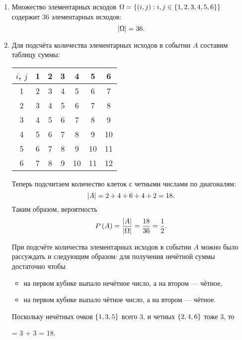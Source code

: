 \begin{enumerate}
    \item
    Множество элементарных исходов $\Omega = \left \{ (i, j): i, j \in \left \{ 1, 2, 3, 4, 5, 6\right \} \right \}$ содержит 36 элементарных исходов:
    \begin{equation}
        \left | \Omega \right | = 36.
    \end{equation}

    \item
    Для подсчёта количества элементарных исходов в событии $A$ составим таблицу суммы:
    \begin{center}
        \begin{tabular}{c|c|c|c|c|c|c|}
            $i$, $j$ & 1 & 2 & 3 & 4  & 5  & 6  \\
            \hline
            1        & 2 & 3 & 4 & 5  & 6  & 7  \\
            \hline
            2        & 3 & 4 & 5 & 6  & 7  & 8  \\
            \hline
            3        & 4 & 5 & 6 & 7  & 8  & 9  \\
            \hline
            4        & 5 & 6 & 7 & 8  & 9  & 10 \\
            \hline
            5        & 6 & 7 & 8 & 9  & 10 & 11 \\
            \hline
            6        & 7 & 8 & 9 & 10 & 11 & 12 \\
            \hline
        \end{tabular}
    \end{center}
    Теперь подсчитаем количество клеток с четными числами по диагоналям:
    \begin{equation}
        \left | A \right | = 2 + 4 + 6 + 4 + 2 = 18 .
    \end{equation}
    Таким образом, вероятность
    \begin{equation}
        P \left ( A \right ) = \frac{\left | A \right |}{\left | \Omega \right |} = \frac{18}{36} = \frac{1}{2} .
    \end{equation}

    При подсчёте количества элементарных исходов в событии $A$ можно было рассуждать и следующим образом: для получения нечётной суммы достаточно чтобы
    \begin{itemize}
        \item на первом кубике выпало нечётное число, а на втором --- чётное,
        \item на первом кубике выпало чётное число, а на втором --- чётное.
    \end{itemize}
    Поскольку нечётных очков $\left \{ 1, 3, 5 \right \}$ всего 3, и четных $\left \{ 2, 4, 6 \right \}$ тоже 3, то
    \begin{enumerate}
         = 3  + 3  = 18.
    \end{enumerate}


\end{enumerate}
